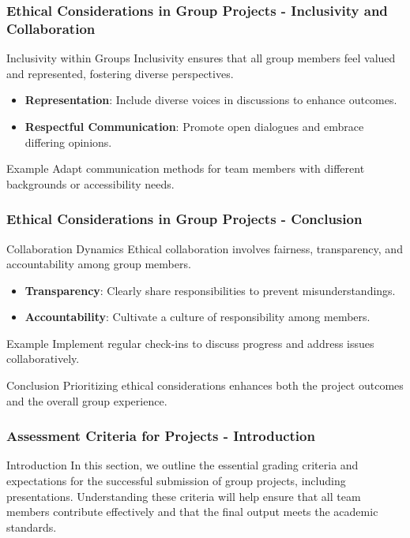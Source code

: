 \documentclass[aspectratio=169]{beamer}
\begin{document}
\begin{frame}[fragile]
    \frametitle{Ethical Considerations in Group Projects - Inclusivity and Collaboration}
    \begin{block}{Inclusivity within Groups}
        Inclusivity ensures that all group members feel valued and represented, fostering diverse perspectives.
    \end{block}
    \begin{itemize}
        \item \textbf{Representation}: Include diverse voices in discussions to enhance outcomes.
        \item \textbf{Respectful Communication}: Promote open dialogues and embrace differing opinions.
    \end{itemize}
    \begin{block}{Example}
        Adapt communication methods for team members with different backgrounds or accessibility needs.
    \end{block}
\end{frame}

\begin{frame}[fragile]
    \frametitle{Ethical Considerations in Group Projects - Conclusion}
    \begin{block}{Collaboration Dynamics}
        Ethical collaboration involves fairness, transparency, and accountability among group members.
    \end{block}
    \begin{itemize}
        \item \textbf{Transparency}: Clearly share responsibilities to prevent misunderstandings.
        \item \textbf{Accountability}: Cultivate a culture of responsibility among members.
    \end{itemize}
    \begin{block}{Example}
        Implement regular check-ins to discuss progress and address issues collaboratively.
    \end{block}
    \begin{block}{Conclusion}
        Prioritizing ethical considerations enhances both the project outcomes and the overall group experience.
    \end{block}
\end{frame}

\begin{frame}[fragile]
    \frametitle{Assessment Criteria for Projects - Introduction}
    \begin{block}{Introduction}
        In this section, we outline the essential grading criteria and expectations for the successful submission of group projects, including presentations. 
        Understanding these criteria will help ensure that all team members contribute effectively and that the final output meets the academic standards.
    \end{block}
\end{frame}
\end{document}

